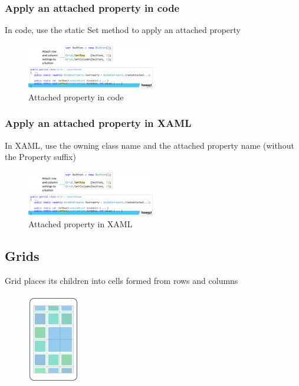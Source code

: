\documentclass{article}
\begin{document}
\subsubsection{Apply an attached property in code}

In code, use the static Set method to apply an attached property

\begin{figure}[H]
    \centering
    \includegraphics[width=0.5\textwidth]{xaml-attachedproperties3.png}
    \caption{Attached property in code}
\end{figure}

\subsubsection{Apply an attached property in XAML}

In XAML, use the owning class name and the attached property name (without the Property suffix)

\begin{figure}[H]
    \centering
    \includegraphics[width=0.5\textwidth]{xaml-attachedproperties3.png}
    \caption{Attached property in XAML}
\end{figure}

\subsection{Grids}

Grid places its children into cells formed from rows and columns

\begin{figure}[H]
    \centering
    \includegraphics[width=0.2\textwidth]{xaml-grid1.png}
    \caption{}
\end{figure}
\end{document}

